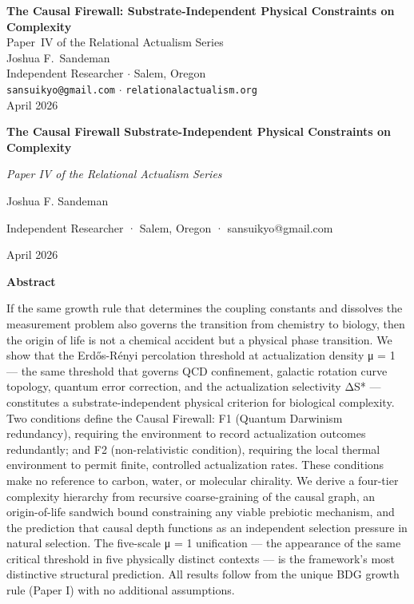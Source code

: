\documentclass[12pt,a4paper]{article}
\begin{document}
\begin{center}
{\LARGE\bfseries The Causal Firewall: Substrate-Independent Physical Constraints on Complexity}\\[18pt]
{\large Paper~IV of the Relational Actualism Series}\\[12pt]
{\large Joshua F.\ Sandeman}\\[4pt]
{\small Independent Researcher $\cdot$ Salem, Oregon}\\
{\small\texttt{sansuikyo@gmail.com} $\cdot$ \texttt{relationalactualism.org}}\\[6pt]
{\small April 2026}
\end{center}
\vspace{1em}

\textbf{The Causal Firewall Substrate-Independent Physical Constraints
on Complexity}

\emph{Paper IV of the Relational Actualism Series}

Joshua F. Sandeman

Independent Researcher · Salem, Oregon · sansuikyo@gmail.com

April 2026

\textbf{Abstract}

If the same growth rule that determines the coupling constants and
dissolves the measurement problem also governs the transition from
chemistry to biology, then the origin of life is not a chemical accident
but a physical phase transition. We show that the Erdős-Rényi
percolation threshold at actualization density μ = 1 --- the same
threshold that governs QCD confinement, galactic rotation curve
topology, quantum error correction, and the actualization selectivity
ΔS* --- constitutes a substrate-independent physical criterion for
biological complexity. Two conditions define the Causal Firewall: F1
(Quantum Darwinism redundancy), requiring the environment to record
actualization outcomes redundantly; and F2 (non-relativistic condition),
requiring the local thermal environment to permit finite, controlled
actualization rates. These conditions make no reference to carbon,
water, or molecular chirality. We derive a four-tier complexity
hierarchy from recursive coarse-graining of the causal graph, an
origin-of-life sandwich bound constraining any viable prebiotic
mechanism, and the prediction that causal depth functions as an
independent selection pressure in natural selection. The five-scale μ =
1 unification --- the appearance of the same critical threshold in five
physically distinct contexts --- is the framework's most distinctive
structural prediction. All results follow from the unique BDG growth
rule (Paper I) with no additional assumptions.
\end{document}
